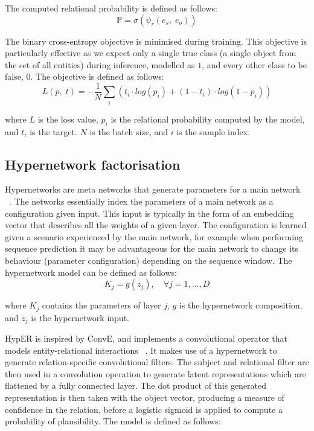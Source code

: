 \newpage

\noindent The computed relational probability is defined as follows: 
\begin{equation}
	\mathbb{P} = \sigma(\psi_r(e_s, \; e_o)) 
\end{equation}

\noindent The binary cross-entropy objective is minimised during training. This objective is particularly effective as we expect only a single true class (a single object from the set of all entities) during inference, modelled as $1$, and every other class to be false, $0$. The objective is defined as follows:
\begin{equation}
	L(p, \; t) =  -\frac{1}{N}\sum_i(t_i \cdot log(p_i) + (1 - t_i) \cdot log(1 - p_i))
\end{equation}

\noindent where $ L $ is the loss value, $ p_i $ is the relational probability computed by the model, and $ t_i $ is the target. $ N $ is the batch size, and $ i $ is the sample index.

\subsection{Hypernetwork factorisation}

Hypernetworks are meta networks that generate parameters for a main network \unskip ~\citep{ha2016hypernetworks}. The networks essentially index the parameters of a main network as a configuration given input. This input is typically in the form of an embedding vector that describes all the weights of a given layer. The configuration is learned given a scenario experienced by the main network, for example when performing sequence prediction it may be advantageous for the main network to change its behaviour (parameter configuration) depending on the sequence window. The hypernetwork model can be defined as follows: 
\begin{equation}
	K_j = g(z_j), \quad \forall j = 1, \dots, D
\end{equation}

\noindent where $ K_j $ contains the parameters of layer $ j $, $ g $ is the hypernetwork composition, and $ z_j $ is the hypernetwork input. \par

\noindent HypER is inspired by ConvE, and implements a convolutional operator that models entity-relational interactions \unskip ~\citep{balazevic2019hypernetwork}. It makes use of a hypernetwork to generate relation-specific convolutional filters. The subject and relational filter are then used in a convolution operation to generate latent representations which are flattened by a fully connected layer. The dot product of this generated representation is then taken with the object vector, producing a measure of confidence in the relation, before a logistic sigmoid is applied to compute a probability of plausibility. The model is defined as follows: \newpage

